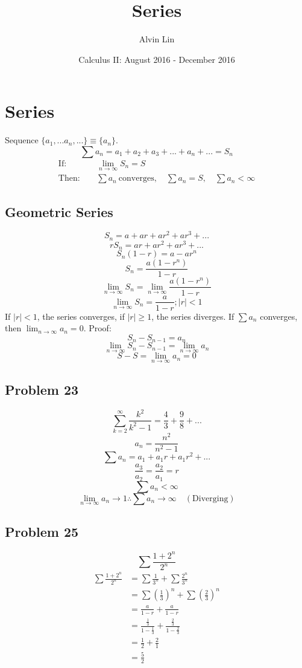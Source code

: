 \documentclass[letterpaper, 12pt]{math}
\title{Series}
\author{Alvin Lin}
\date{Calculus II: August 2016 - December 2016}
\begin{document}
\maketitle

\section*{Series}
Sequence \( \bigg\{a_{1},...a_{n},...\bigg\} \equiv \bigg\{a_{n}\bigg\} \).
\[ \sum{a_{n}} = a_{1}+a_{2}+a_{3}+...+a_{n}+... = S_{n} \]
\begin{align*}
  \mathrm{If:} & \quad \lim_{n\to\infty}{S_{n}} = S \\
  \mathrm{Then:} & \quad \sum{a_{n}} \mathrm{\ converges},
    \quad \sum{a_{n}} = S, \quad \sum{a_{n}}<\infty
\end{align*}

\subsection*{Geometric Series}
\[ S_{n} = a+ar+ar^{2}+ar^{3}+... \]
\[ rS_{n} = ar+ar^{2}+ar^{3}+... \]
\[ S_{n}(1-r) = a-ar^{n} \]
\[ S_{n} = \frac{a(1-r^{n})}{1-r} \]
\[ \lim_{n\to\infty}{S_{n}} = \lim_{n\to\infty}{\frac{a(1-r^{n})}{1-r}} \]
\[ \lim_{n\to\infty}{S_{n}} = \frac{a}{1-r}; |r| < 1 \]
If \( |r| < 1 \), the series converges, if \( |r| \geq 1 \), the series
diverges. If \( \sum{a_{n}} \) converges,
then \( \lim_{n\to\infty}{a_{n}} = 0 \). Proof:
\[ S_{n}-S_{n-1} = a_{n} \]
\[ \lim_{n\to\infty}{S_{n}-S_{n-1}} = \lim_{n\to\infty}{a_{n}} \]
\[ S-S = \lim_{n\to\infty}{a_{n}} = 0 \]

\subsection*{Problem 23}
\[ \sum_{k=2}^{\infty}\frac{k^{2}}{k^{2}-1} = \frac{4}{3}+\frac{9}{8}+...\]
\[ a_{n} = \frac{n^{2}}{n^{2}-1} \]
\[ \sum{a_{n}} = a_{1}+a_{1}r+a_{1}r^{2}+... \]
\[ \frac{a_{3}}{a_{2}} = \frac{a_{2}}{a_{1}} = r \]
\[ \sum{a_{n}} < \infty \]
\[ \lim_{n\to\infty}a_{n}\to1 \therefore \sum{a_{n}}\to\infty \quad
   \mathrm{(Diverging)} \]

\subsection*{Problem 25}
\[ \sum\frac{1+2^{n}}{2^{n}} \]
\begin{align*}
  \sum\frac{1+2^{n}}{2^{n}} &= \sum\frac{1}{3^{n}}+\sum\frac{2^{n}}{3^{n}} \\
  &= \sum(\frac{1}{3})^{n}+\sum(\frac{2}{3})^{n} \\
  &= \frac{a}{1-r}+\frac{a}{1-r} \\
  &= \frac{\frac{1}{3}}{1-\frac{1}{3}}+\frac{\frac{2}{3}}{1-\frac{2}{3}} \\
  &= \frac{1}{2}+\frac{2}{1} \\
  &= \frac{5}{2}
\end{align*}
\end{document}
